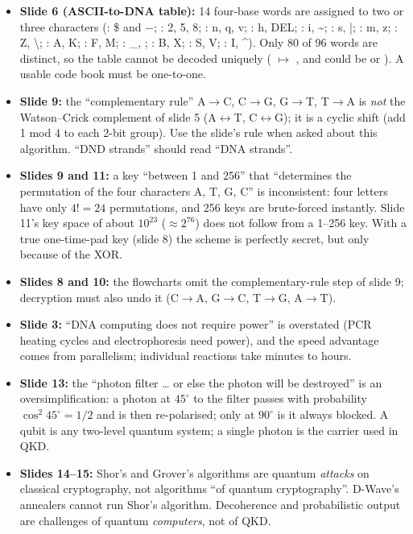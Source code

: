 \begin{fixbox}
\begin{itemize}
  \item \textbf{Slide 6 (ASCII-to-DNA table):} 14 four-base words are assigned to two or three characters (: \$ and $-$; : 2, 5, 8; : n, q, v; : h, DEL; : i, \textasciitilde; : s, |; : m, z; : Z, \textbackslash; : A, K; : F, M; : \_, \textasciigrave; : B, X; : S, V; : I, \textasciicircum). Only 80 of 96 words are distinct, so the table cannot be decoded uniquely ( $\mapsto$ , and  could be  or \ttx{\textasciicircum}). A usable code book must be one-to-one.
  \item \textbf{Slide 9:} the ``complementary rule'' A$\to$C, C$\to$G, G$\to$T, T$\to$A is \emph{not} the Watson--Crick complement of slide 5 (A$\leftrightarrow$T, C$\leftrightarrow$G); it is a cyclic shift (add 1 mod 4 to each 2-bit group). Use the slide's rule when asked about this algorithm. ``DND strands'' should read ``DNA strands''.
  \item \textbf{Slides 9 and 11:} a key ``between 1 and 256'' that ``determines the permutation of the four characters A, T, G, C'' is inconsistent: four letters have only $4! = 24$ permutations, and 256 keys are brute-forced instantly. Slide 11's key space of about $10^{23}$ ($\approx 2^{76}$) does not follow from a 1--256 key. With a true one-time-pad key (slide 8) the scheme is perfectly secret, but only because of the XOR.
  \item \textbf{Slides 8 and 10:} the flowcharts omit the complementary-rule step of slide 9; decryption must also undo it (C$\to$A, G$\to$C, T$\to$G, A$\to$T).
  \item \textbf{Slide 3:} ``DNA computing does not require power'' is overstated (PCR heating cycles and electrophoresis need power), and the speed advantage comes from parallelism; individual reactions take minutes to hours.
  \item \textbf{Slide 13:} the ``photon filter \dots{} or else the photon will be destroyed'' is an oversimplification: a photon at $45^\circ$ to the filter passes with probability $\cos^2 45^\circ = 1/2$ and is then re-polarised; only at $90^\circ$ is it always blocked. A qubit is any two-level quantum system; a single photon is the carrier used in QKD.
  \item \textbf{Slides 14--15:} Shor's and Grover's algorithms are quantum \emph{attacks} on classical cryptography, not algorithms ``of quantum cryptography''. D-Wave's annealers cannot run Shor's algorithm. Decoherence and probabilistic output are challenges of quantum \emph{computers}, not of QKD.

\end{itemize}
\end{fixbox}
